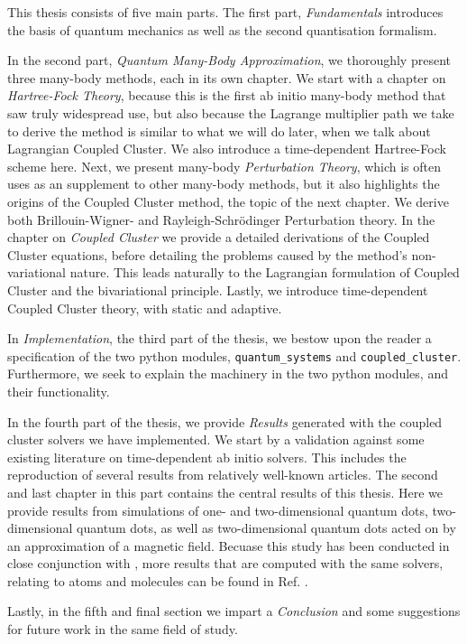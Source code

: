     This thesis consists of five main parts. The first part, \emph{Fundamentals} 
    introduces the basis of quantum mechanics as well as the second quantisation 
    formalism.
    
    In the second part, \emph{Quantum Many-Body Approximation}, we 
    thoroughly present three many-body methods, each in its own chapter.
    We start with a chapter on \emph{Hartree-Fock Theory}, because this is 
    the first ab initio many-body method that saw truly widespread use, but 
    also because the Lagrange multiplier path we take to derive the method is 
    similar to what we will do later, when we talk about Lagrangian Coupled Cluster.
    We also introduce a time-dependent Hartree-Fock scheme here.
    Next, we present many-body \emph{Perturbation Theory}, which is often uses as
    an supplement to other many-body methods, but it also highlights the origins 
    of the Coupled Cluster method, the topic of the next chapter.
    We derive both Brillouin-Wigner- and Rayleigh-Schrödinger Perturbation theory. 
    In the chapter on \emph{Coupled Cluster} we provide a detailed derivations 
    of the Coupled Cluster equations, before detailing the problems caused 
    by the method's non-variational nature. This leads naturally to 
    the Lagrangian formulation of Coupled Cluster\cite{helgaker1988analytical}
    and the bivariational principle\citeauthor{arponen1983variational}. Lastly,
    we introduce time-dependent Coupled Cluster theory, with static and 
    adaptive\cite{kvaal2012ab}.

    In \emph{Implementation}, the third part of the thesis, we bestow upon the reader 
    a specification of the two python modules, \lstinline{quantum_systems} 
    and \lstinline{coupled_cluster}. Furthermore, we seek to explain the machinery
    in the two python modules, and their functionality. 

    In the fourth part of the thesis, we provide \emph{Results} generated with the
    coupled cluster solvers we have implemented. We start by a validation against
    some existing literature on time-dependent ab initio solvers. This includes 
    the reproduction of several results from relatively well-known articles. 
    The second and last chapter in this part contains the central results of 
    this thesis. Here we provide results from simulations of one- and two-dimensional 
    quantum dots, two-dimensional quantum dots, as well as two-dimensional quantum 
    dots acted on by an approximation of a magnetic field. Becuase this study 
    has been conducted in close conjunction with
    \citeauthor{islandwind2019}, more results that are computed with the 
    same solvers, relating to atoms and molecules can be found in Ref.
    \cite{islandwind2019}.
   
    Lastly, in the fifth and final section we impart a \emph{Conclusion} and 
    some suggestions for future work in the same field of study.
